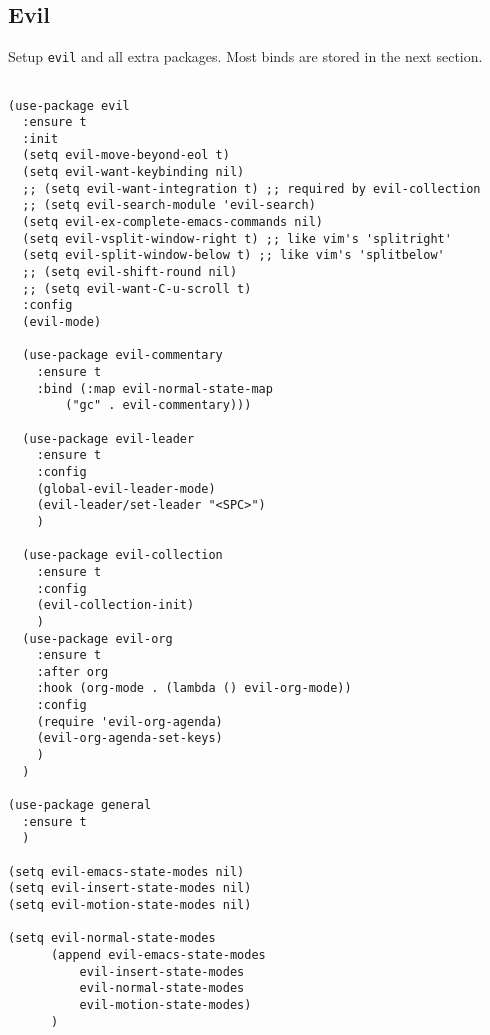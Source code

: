 \documentclass[11pt]{article}
\begin{document}
\subsection{Evil}
\label{sec:org8839acf}
Setup \texttt{evil} and all extra packages. Most binds are stored in the
next section.
\begin{verbatim}

(use-package evil
  :ensure t
  :init
  (setq evil-move-beyond-eol t)
  (setq evil-want-keybinding nil)
  ;; (setq evil-want-integration t) ;; required by evil-collection
  ;; (setq evil-search-module 'evil-search)
  (setq evil-ex-complete-emacs-commands nil)
  (setq evil-vsplit-window-right t) ;; like vim's 'splitright'
  (setq evil-split-window-below t) ;; like vim's 'splitbelow'
  ;; (setq evil-shift-round nil)
  ;; (setq evil-want-C-u-scroll t)
  :config
  (evil-mode)

  (use-package evil-commentary
    :ensure t
    :bind (:map evil-normal-state-map
		("gc" . evil-commentary)))

  (use-package evil-leader
    :ensure t
    :config
    (global-evil-leader-mode)
    (evil-leader/set-leader "<SPC>")
    )

  (use-package evil-collection
    :ensure t
    :config
    (evil-collection-init)
    )
  (use-package evil-org
    :ensure t
    :after org
    :hook (org-mode . (lambda () evil-org-mode))
    :config
    (require 'evil-org-agenda)
    (evil-org-agenda-set-keys)
    )
  )

(use-package general
  :ensure t
  )

(setq evil-emacs-state-modes nil)
(setq evil-insert-state-modes nil)
(setq evil-motion-state-modes nil)

(setq evil-normal-state-modes
      (append evil-emacs-state-modes
	      evil-insert-state-modes
	      evil-normal-state-modes
	      evil-motion-state-modes)
      )

\end{verbatim}
\end{document}
